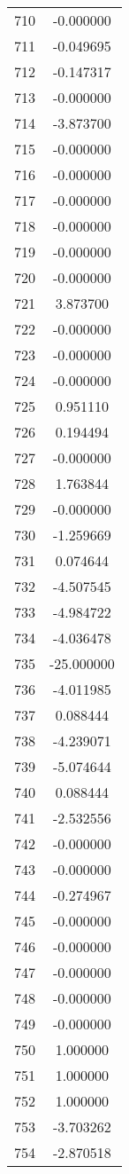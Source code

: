 \documentclass[12pt]{article}
\begin{document}
\begin{longtable}{@{}cc@{}}
710 & -0.000000 \\
711 & -0.049695 \\
712 & -0.147317 \\
713 & -0.000000 \\
714 & -3.873700 \\
715 & -0.000000 \\
716 & -0.000000 \\
717 & -0.000000 \\
718 & -0.000000 \\
719 & -0.000000 \\
720 & -0.000000 \\
721 & 3.873700 \\
722 & -0.000000 \\
723 & -0.000000 \\
724 & -0.000000 \\
725 & 0.951110 \\
726 & 0.194494 \\
727 & -0.000000 \\
728 & 1.763844 \\
729 & -0.000000 \\
730 & -1.259669 \\
731 & 0.074644 \\
732 & -4.507545 \\
733 & -4.984722 \\
734 & -4.036478 \\
735 & -25.000000 \\
736 & -4.011985 \\
737 & 0.088444 \\
738 & -4.239071 \\
739 & -5.074644 \\
740 & 0.088444 \\
741 & -2.532556 \\
742 & -0.000000 \\
743 & -0.000000 \\
744 & -0.274967 \\
745 & -0.000000 \\
746 & -0.000000 \\
747 & -0.000000 \\
748 & -0.000000 \\
749 & -0.000000 \\
750 & 1.000000 \\
751 & 1.000000 \\
752 & 1.000000 \\
753 & -3.703262 \\
754 & -2.870518 \\

\end{longtable}
\end{document}
